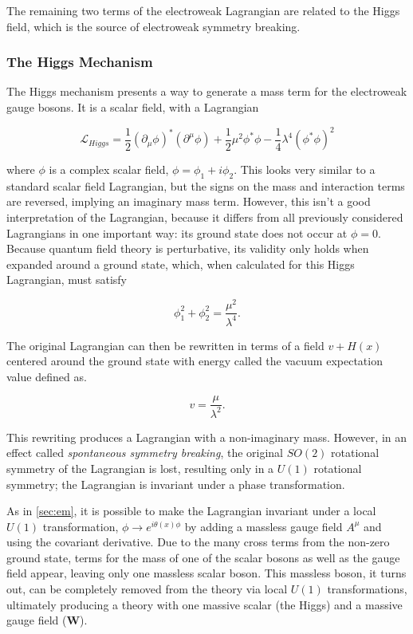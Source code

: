 The remaining two terms of the electroweak Lagrangian are related to the Higgs field, which is the source of electroweak symmetry breaking. 

\subsubsection{The Higgs Mechanism}

The Higgs mechanism presents a way to generate a mass term for the electroweak gauge bosons. It is a scalar field, with a Lagrangian 

\begin{equation}
\mathcal{L}_{Higgs} = \frac{1}{2}(\partial_\mu\phi)^*(\partial^\mu\phi) + \frac{1}{2}\mu^2\phi^*\phi - \frac{1}{4}\lambda^4(\phi^*\phi)^2
\end{equation}

where $\phi$ is a complex scalar field, $\phi = \phi_1 + i\phi_2$. This looks very similar to a standard scalar field Lagrangian, but the signs on the mass and interaction terms are reversed, implying an imaginary mass term. However, this isn't a good interpretation of the Lagrangian, because it differs from all previously considered Lagrangians in one important way: its ground state does not occur at $\phi = 0$. Because quantum field theory is perturbative, its validity only holds when expanded around a ground state, which, when calculated for this Higgs Lagrangian, must satisfy

\begin{equation}
\phi_1^2 + \phi_2^2 = \frac{\mu^2}{\lambda^4} . 
\end{equation}

The original Lagrangian can then be rewritten in terms of a field $v + H(x)$ centered around the ground state with energy called the vacuum expectation value defined as. 

\begin{equation}
v = \frac{\mu}{\lambda^2} . 
\end{equation}

This rewriting produces a Lagrangian with a non-imaginary mass. However, in an effect called \textit{spontaneous symmetry breaking}, the original $SO(2)$ rotational symmetry of the Lagrangian is lost, resulting only in a $U(1)$ rotational symmetry; the Lagrangian is invariant under a phase transformation.

As in \autoref{sec:em}, it is possible to make the Lagrangian invariant under a local $U(1)$ transformation, $\phi \rightarrow e^{i\theta(x)\phi}$ by adding a massless gauge field $A^\mu$ and using the covariant derivative. Due to the many cross terms from the non-zero ground state, terms for the mass of one of the scalar bosons as well as the gauge field appear, leaving only one massless scalar boson. This massless boson, it turns out, can be completely removed from the theory via local $U(1)$ transformations, ultimately producing a theory with one massive scalar (the Higgs) and a massive gauge field ($\bm{W}$). 

